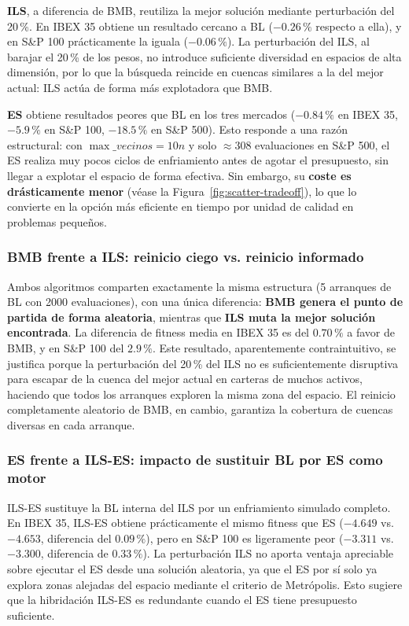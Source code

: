 \textbf{ILS}, a diferencia de BMB, reutiliza la mejor solución mediante perturbación del 20\,\%.
En IBEX 35 obtiene un resultado cercano a BL ($-0.26\,\%$ respecto a ella), y en S\&P 100
prácticamente la iguala ($-0.06\,\%$). La perturbación del ILS, al barajar el 20\,\% de los
pesos, no introduce suficiente diversidad en espacios de alta dimensión, por lo que la búsqueda
reincide en cuencas similares a la del mejor actual: ILS actúa de forma más explotadora que BMB.

\textbf{ES} obtiene resultados peores que BL en los tres mercados ($-0.84\,\%$ en IBEX 35,
$-5.9\,\%$ en S\&P 100, $-18.5\,\%$ en S\&P 500). Esto responde a una razón estructural: con
$\max\_vecinos = 10n$ y solo $\approx 308$ evaluaciones en S\&P 500, el ES realiza muy pocos
ciclos de enfriamiento antes de agotar el presupuesto, sin llegar a explotar el espacio de forma
efectiva. Sin embargo, su \textbf{coste es drásticamente menor} (véase la Figura~\ref{fig:scatter-tradeoff}),
lo que lo convierte en la opción más eficiente en tiempo por unidad de calidad en problemas pequeños.

\subsubsection*{BMB frente a ILS: reinicio ciego vs. reinicio informado}

Ambos algoritmos comparten exactamente la misma estructura (5 arranques de BL con 2000 evaluaciones),
con una única diferencia: \textbf{BMB genera el punto de partida de forma aleatoria}, mientras que
\textbf{ILS muta la mejor solución encontrada}. La diferencia de fitness media en IBEX 35 es del
$0.70\,\%$ a favor de BMB, y en S\&P 100 del $2.9\,\%$. Este resultado, aparentemente contraintuitivo,
se justifica porque la perturbación del 20\,\% del ILS no es suficientemente disruptiva para escapar de la
cuenca del mejor actual en carteras de muchos activos, haciendo que todos los arranques exploren
la misma zona del espacio. El reinicio completamente aleatorio de BMB, en cambio, garantiza la
cobertura de cuencas diversas en cada arranque.

\subsubsection*{ES frente a ILS-ES: impacto de sustituir BL por ES como motor}

ILS-ES sustituye la BL interna del ILS por un enfriamiento simulado completo. En IBEX 35, ILS-ES
obtiene prácticamente el mismo fitness que ES ($-4.649$ vs. $-4.653$, diferencia del $0.09\,\%$),
pero en S\&P 100 es ligeramente peor ($-3.311$ vs. $-3.300$, diferencia de $0.33\,\%$). La
perturbación ILS no aporta ventaja apreciable sobre ejecutar el ES desde una solución aleatoria,
ya que el ES por sí solo ya explora zonas alejadas del espacio mediante el criterio de Metrópolis.
Esto sugiere que la hibridación ILS-ES es redundante cuando el ES tiene presupuesto suficiente.

